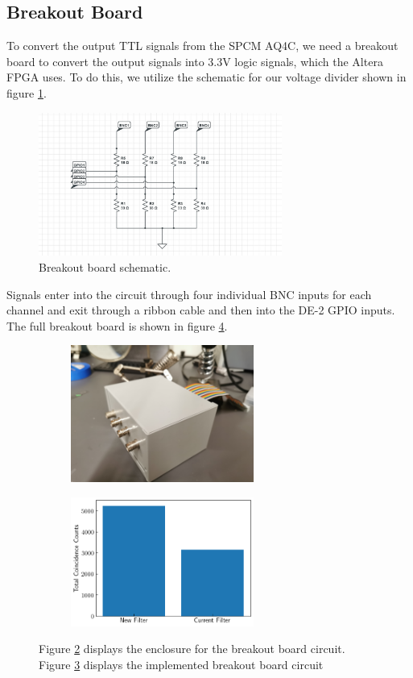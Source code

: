 \documentclass[letterpaper, 11 pt]{article}
\begin{document}
\subsection{Breakout Board}

To convert the output TTL signals from the SPCM AQ4C, we need a breakout board to convert
the output signals into 3.3V logic signals, which the Altera FPGA uses. To do this, we utilize
the schematic for our voltage divider shown in figure \ref{fig:divide}.
\begin{figure}[H]
    \centering
    \includegraphics[width = 8cm]{BB_schematic.jpg}
    \caption{Breakout board schematic.}
    \label{fig:divide}
\end{figure}
Signals enter into the circuit through four individual BNC inputs for each channel and exit through a ribbon cable and then into the DE-2
GPIO inputs. The full breakout board is shown in figure \ref{fig:bb}.
\begin{figure}[H]%
    \centering
    \begin{subfigure}{.4\textwidth}
    \includegraphics[width=6cm]{BB_box.jpg}
    \caption{ }
    \label{fig:box}
    \end{subfigure}
    \begin{subfigure}{.4\textwidth}
    \includegraphics[width = 6cm]{filter_cc_irled.png}
    \caption{ }
    \label{fig:circ}
    \end{subfigure}
    \caption{Figure \ref{fig:box} displays the enclosure for the breakout board circuit.
    Figure \ref{fig:circ} displays the implemented breakout board circuit}
    \label{fig:bb}
\end{figure}
\end{document}
